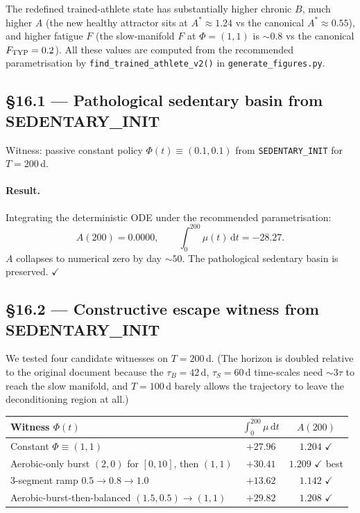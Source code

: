 \documentclass[11pt,a4paper]{article}
\theoremstyle{definition}
\newcommand{\dd}{\,\mathrm{d}}
\begin{document}
The redefined trained-athlete state has substantially higher chronic $B$, much higher $A$ (the new healthy attractor sits at $A^* \approx 1.24$ vs the canonical $A^* \approx 0.55$), and higher fatigue $F$ (the slow-manifold $F$ at $\Phi = (1, 1)$ is $\sim 0.8$ vs the canonical $F_{\rm TYP} = 0.2$). All these values are computed from the recommended parametrisation by \texttt{find\_trained\_athlete\_v2()} in \texttt{generate\_figures.py}.

\subsection{§16.1 — Pathological sedentary basin from SEDENTARY\_INIT}

Witness: passive constant policy $\Phi(t) \equiv (0.1, 0.1)$ from \texttt{SEDENTARY\_INIT} for $T = 200$\,d.

\paragraph{Result.} Integrating the deterministic ODE under the recommended parametrisation:
\[
A(200) = 0.0000, \qquad \int_0^{200} \mu(t)\dd t = -28.27.
\]
$A$ collapses to numerical zero by day $\sim 50$. The pathological sedentary basin is preserved. $\checkmark$

\subsection{§16.2 — Constructive escape witness from SEDENTARY\_INIT}

We tested four candidate witnesses on $T = 200$\,d. (The horizon is doubled relative to the original document because the $\tau_B = 42$\,d, $\tau_S = 60$\,d time-scales need $\sim 3\tau$ to reach the slow manifold, and $T = 100$\,d barely allows the trajectory to leave the deconditioning region at all.)

\begin{center}\small
\begin{tabular}{lcc}
\toprule
Witness $\Phi(t)$ & $\int_0^{200} \mu \dd t$ & $A(200)$ \\
\midrule
Constant $\Phi \equiv (1, 1)$                          & $+27.96$ & $1.204$ \;$\checkmark$ \\
Aerobic-only burst $(2, 0)$ for $[0, 10]$, then $(1, 1)$ & $+30.41$ & $\boldsymbol{1.209}$ \;$\checkmark$ best \\
3-segment ramp $0.5 \to 0.8 \to 1.0$                   & $+13.62$ & $1.142$ \;$\checkmark$ \\
Aerobic-burst-then-balanced $(1.5, 0.5) \to (1, 1)$    & $+29.82$ & $1.208$ \;$\checkmark$ \\
\bottomrule
\end{tabular}
\end{center}
\end{document}
